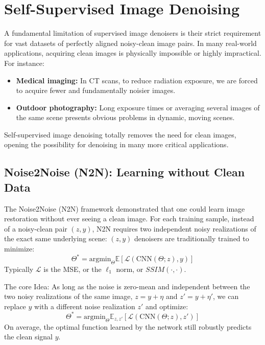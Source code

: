 \section{Self-Supervised Image Denoising}
A fundamental limitation of supervised image denoisers is their strict requirement for vast datasets of perfectly aligned noisy-clean image pairs. In many real-world applications, acquiring clean images is physically impossible or highly impractical. For instance:
\begin{itemize}
    \item \textbf{Medical imaging:} In CT scans, to reduce radiation exposure, we are forced to acquire fewer and fundamentally noisier images.
    \item \textbf{Outdoor photography:} Long exposure times or averaging several images of the same scene presents obvious problems in dynamic, moving scenes.
\end{itemize}
Self-supervised image denoising totally removes the need for clean images, opening the possibility for denoising in many more critical applications.

\subsection{Noise2Noise (N2N): Learning without Clean Data}
The Noise2Noise (N2N) framework demonstrated that one could learn image restoration without ever seeing a clean image. For each training sample, instead of a noisy-clean pair $(z, y)$, N2N requires two independent noisy realizations of the exact same underlying scene: $(z, y)$ denoisers are traditionally trained to minimize:
\begin{equation}
    \Theta^* = \text{argmin}_\Theta \mathbb{E} [\mathcal{L}(\text{CNN}(\Theta; z), y)]
\end{equation}
Typically $\mathcal{L}$ is the MSE, or the $\ell_1$ norm, or $SSIM(\cdot, \cdot)$.

The core Idea: As long as the noise is zero-mean and independent between the two noisy realizations of the same image, $z = y + \eta$ and $z' = y + \eta'$, we can replace $y$ with a different noise realization $z'$ and optimize:
\begin{equation}
    \Theta^* = \text{argmin}_\Theta \mathbb{E}_{z,z'} [\mathcal{L}(\text{CNN}(\Theta; z), z')]
\end{equation}
On average, the optimal function learned by the network still robustly predicts the clean signal $y$. 

